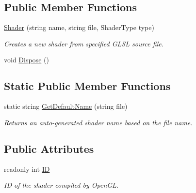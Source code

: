 \subsection*{Public Member Functions}
\begin{DoxyCompactItemize}
\item 
\hyperlink{class_tri_devs_1_1_tri_engine2_d_1_1_shaders_1_1_shader_af39046ede99384bb043aee389664a2e0}{Shader} (string name, string file, Shader\-Type type)
\begin{DoxyCompactList}\small\item\em Creates a new shader from specified G\-L\-S\-L source file. \end{DoxyCompactList}\item 
void \hyperlink{class_tri_devs_1_1_tri_engine2_d_1_1_shaders_1_1_shader_aeb819c5adbefdbdf1a48c41f4cc8cc10}{Dispose} ()
\end{DoxyCompactItemize}
\subsection*{Static Public Member Functions}
\begin{DoxyCompactItemize}
\item 
static string \hyperlink{class_tri_devs_1_1_tri_engine2_d_1_1_shaders_1_1_shader_a804a9306b8307443c1eee1b2c6d7b8cd}{Get\-Default\-Name} (string file)
\begin{DoxyCompactList}\small\item\em Returns an auto-\/generated shader name based on the file name. \end{DoxyCompactList}\end{DoxyCompactItemize}
\subsection*{Public Attributes}
\begin{DoxyCompactItemize}
\item 
readonly int \hyperlink{class_tri_devs_1_1_tri_engine2_d_1_1_shaders_1_1_shader_ab958bb70d4a48ef47aead056587c1f6c}{I\-D}
\begin{DoxyCompactList}\small\item\em I\-D of the shader compiled by Open\-G\-L. \end{DoxyCompactList}\end{DoxyCompactItemize}
